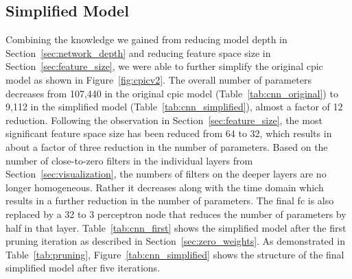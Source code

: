 \documentclass{article}
\begin{document}
\subsection{Simplified Model}
\label{sec:simplified_model}
%
Combining the knowledge we gained from reducing model depth in Section~\ref{sec:network_depth} and reducing feature space size in Section~\ref{sec:feature_size}, we were able to further simplify the original \gls{cpic} model as shown in Figure~\ref{fig:cpicv2}.
The overall number of parameters decreases from 107,440 in the original \gls{cpic} model (Table~\ref{tab:cnn_original}) to 9,112 in the simplified model (Table~\ref{tab:cnn_simplified}), almost a factor of 12 reduction.
Following the observation in Section~\ref{sec:feature_size}, the most significant feature space size has been reduced from 64 to 32, which results in about a factor of three reduction in the number of parameters.
Based on the number of close-to-zero filters in the individual layers from Section~\ref{sec:visualization}, the numbers of filters on the deeper layers are no longer homogeneous.
Rather it decreases along with the time domain which results in a further reduction in the number of parameters.
The final \gls{fc} is also replaced by a 32 to 3 perceptron node that reduces the number of parameters by half in that layer.
Table~\ref{tab:cnn_first} shows the simplified model after the first pruning iteration as described in Section~\ref{sec:zero_weights}.
As demonstrated in Table~\ref{tab:pruning}, Figure~\ref{tab:cnn_simplified} shows the structure of the final simplified model after five iterations.
%
\end{document}
